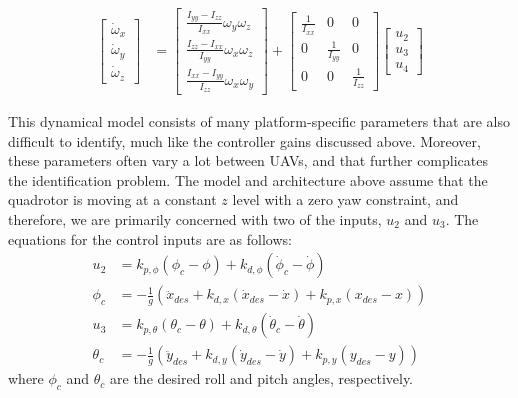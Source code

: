 \documentclass[letterpaper, 10 pt, conference]{ieeeconf}  %
\begin{document}
\begin{equation}
\begin{aligned}
	\begin{bmatrix}\dot{\omega}_{x} \\ \dot{\omega}_{y} \\ \dot{\omega}_{z}\end{bmatrix} &= \begin{bmatrix}\frac{I_{yy} - I_{zz}}{I_{xx}} \omega_{y}\omega_{z}\\ \frac{I_{zz} - I_{xx}}{I_{yy}} \omega_{x}\omega_{z} \\ \frac{I_{xx} - I_{yy}}{I_{zz}} \omega_{x}\omega_{y} \end{bmatrix} +  \begin{bmatrix}\frac{1}{I_{xx}} & 0 & 0\\ 0 & \frac{1}{I_{yy}} & 0\\ 0 & 0 & \frac{1}{I_{zz}}\end{bmatrix} \begin{bmatrix}u_{2} \\ u_{3} \\ u_{4} \end{bmatrix}
	\end{aligned}
	\label{eq:quadrotor_dynamics} \nonumber
\end{equation} 

This dynamical model consists of many platform-specific parameters that are also difficult to identify, much like the controller gains discussed above. Moreover, these parameters often vary a lot between UAVs, and that further complicates the identification problem. The model and architecture above assume that the quadrotor is moving at a constant $z$ level with a zero yaw constraint, and therefore, we are primarily concerned with two of the inputs, $u_2$ and $u_3$. The equations for the control inputs are as follows:
\begin{align} \label{eq:cinputs}
    u_2 &= k_{p,\phi}(\phi_c-\phi) + k_{d,\phi}(\dot{\phi}_c - \dot{\phi}) \nonumber \\
    \phi_c &= -\frac{1}{g}(\ddot{x}_{des} + k_{d,x}(\dot{x}_{des}-\dot{x}) + k_{p,x}(x_{des}-x)) \nonumber \\
    u_3 &= k_{p,\theta}(\theta_c-\theta) + k_{d,\theta}(\dot{\theta}_c - \dot{\theta}) \nonumber \\
    \theta_c &= -\frac{1}{g}(\ddot{y}_{des} + k_{d,y}(\dot{y}_{des}-\dot{y}) + k_{p,y}(y_{des}-y))
\end{align}
where $\phi_c$ and $\theta_c$ are the desired roll and pitch angles, respectively.
\end{document}
